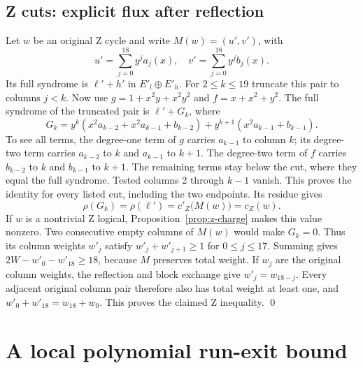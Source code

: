 \documentclass{article}
\begin{document}
\subsection{Z cuts: explicit flux after reflection}\label{sec:z-cuts}

Let \(w\) be an original Z cycle and write \(M(w) = (u', v')\), with
\begin{equation}
  u' = \sum_{j=0}^{18} y^j a_j(x), \quad
  v' = \sum_{j=0}^{18} y^j b_j(x).
\end{equation}
Its full syndrome is \(\ell' + h'\) in \(E'_l \oplus E'_h\). For \(2 \le k \le 19\) truncate
this pair to columns \(j < k\). Now use \(g = 1 + x^2 y + x^2 y^2\) and
\(f = x + x^2 + y^2\). The full syndrome of the truncated pair is \(\ell' + G_k\), where
\begin{equation}
  G_k = y^k (x^2 a_{k-2} + x^2 a_{k-1} + b_{k-2})
  + y^{k+1} (x^2 a_{k-1} + b_{k-1}).
\end{equation}
To see all terms, the degree-one term of \(g\) carries \(a_{k-1}\) to column \(k\); its
degree-two term carries \(a_{k-2}\) to \(k\) and \(a_{k-1}\) to \(k + 1\). The degree-two
term of \(f\) carries \(b_{k-2}\) to \(k\) and \(b_{k-1}\) to \(k + 1\). The remaining terms
stay below the cut, where they equal the full syndrome. Tested columns 2 through \(k - 1\)
vanish. This proves the identity for every listed cut, including the two endpoints. Its
residue gives
\begin{equation}
  \rho(G_k) = \rho(\ell') = c'_Z\bigl(M(w)\bigr) = c_Z(w).
\end{equation}
If \(w\) is a nontrivial Z logical, Proposition~\ref{prop:z-charge} makes this value nonzero. Two
consecutive empty columns of \(M(w)\) would make \(G_k = 0\). Thus its column weights
\(w'_j\) satisfy \(w'_j + w'_{j+1} \ge 1\) for \(0 \le j \le 17\). Summing gives
\(2W - w'_0 - w'_{18} \ge 18\), because \(M\) preserves total weight. If \(w_j\) are the
original column weights, the reflection and block exchange give \(w'_j = w_{18-j}\). Every
adjacent original column pair therefore also has total weight at least one, and
\(w'_0 + w'_{18} = w_{18} + w_0\). This proves the claimed Z inequality. \qed

\section{A local polynomial run-exit bound}\label{sec:run-exit}
\end{document}
